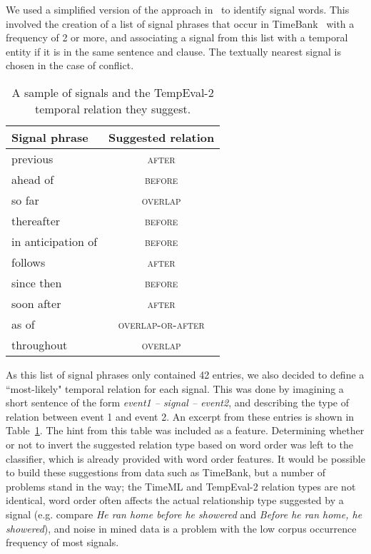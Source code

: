 \documentclass[11pt]{article}
\begin{document}
We used a simplified version of the approach in~ to identify signal words. This involved the creation of a list of signal phrases that occur in TimeBank~\cite{pustejovsky2003timebank} with a frequency of 2 or more, and associating a signal from this list with a temporal entity if it is in the same sentence and clause. The textually nearest signal is chosen in the case of conflict.

\small
\begin{table}
\begin{center}
\caption{A sample of signals and the TempEval-2 temporal relation they suggest.}
\label{tab:signalHints}
\begin{tabular}{| l | c |}
\hline
 \textbf{Signal phrase} & \textbf{Suggested relation} \\
\hline
previous & \textsc{after} \\
ahead of & \textsc{before} \\
so far & \textsc{overlap} \\
thereafter & \textsc{before} \\
in anticipation of & \textsc{before} \\
follows & \textsc{after} \\
since then & \textsc{before} \\
soon after & \textsc{after} \\
as of & \textsc{overlap-or-after} \\
throughout & \textsc{overlap} \\
\hline
\end{tabular}
\end{center}
\end{table}
\normalsize

As this list of signal phrases only contained 42 entries, we also decided to define a ``most-likely" temporal relation for each signal. This was done by imagining a short sentence of the form \emph{event1 -- signal -- event2}, and describing the type of relation between event 1 and event 2. An excerpt from these entries is shown in Table~\ref{tab:signalHints}. The hint from this table was included as a feature. Determining whether or not to invert the suggested relation type based on word order was left to the classifier, which is already provided with word order features. It would be possible to build these suggestions from data such as TimeBank, but a number of problems stand in the way; the TimeML and TempEval-2 relation types are not identical, word order often affects the actual relationship type suggested by a signal (e.g. compare \emph{He ran home before he showered} and \emph{Before he ran home, he showered}), and noise in mined data is a problem with the low corpus occurrence frequency of most signals.
\end{document}

